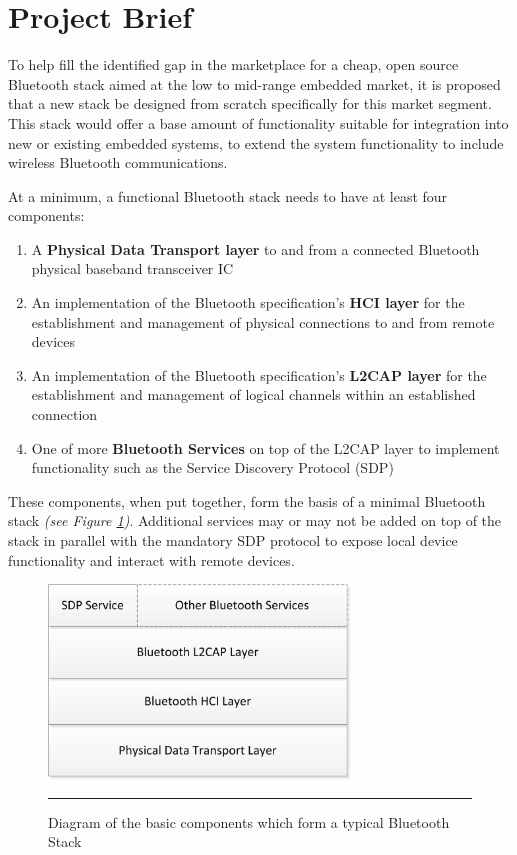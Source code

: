 \section{Project Brief}

To help fill the identified gap in the marketplace for a cheap, open source Bluetooth stack aimed at the low to mid-range embedded market, it is proposed that a new stack be designed from scratch specifically for this market segment. This stack would offer a base amount of functionality suitable for integration into new or existing embedded systems, to extend the system functionality to include wireless Bluetooth communications.

At a minimum, a functional Bluetooth stack needs to have at least four components:

\begin{enumerate}
	\item A \textbf{Physical Data Transport layer} to and from a connected Bluetooth physical baseband transceiver IC
	\item An implementation of the Bluetooth specification's \textbf{HCI layer} for the establishment and management of physical connections to and from remote devices
	\item An implementation of the Bluetooth specification's \textbf{L2CAP layer} for the establishment and management of logical channels within an established connection
	\item One of more \textbf{Bluetooth Services} on top of the L2CAP layer to implement functionality such as the Service Discovery Protocol (SDP)
\end{enumerate}

These components, when put together, form the basis of a minimal Bluetooth stack \emph{(see Figure \ref{fig:btstack})}. Additional services may or may not be added on top of the stack in parallel with the mandatory SDP protocol to expose local device functionality and interact with remote devices.

\begin{figure}[H]
	\centering
		\includegraphics[width=80mm]{./Figures/BluetoothStack.png}
	\rule{35em}{0.5pt}
	\caption[Diagram of a typical Bluetooth Stack]{Diagram of the basic components which form a typical Bluetooth Stack}
	\label{fig:btstack}
\end{figure}

